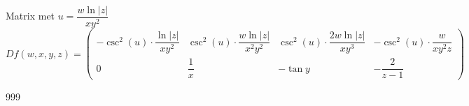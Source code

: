 \documentclass[a4paper]{article}
\begin{document}
Matrix met $u = \dfrac{w\ln|z|}{xy^2}$\\

$Df(w,x,y,z)= \left(\begin{array}{cccc}
-\csc^2\left(u\right)\cdot\dfrac{\ln|z|}{xy^2} & \csc^2\left(u\right)\cdot\dfrac{w\ln|z|}{x^2y^2} &
\csc^2\left(u\right)\cdot\dfrac{2w\ln|z|}{xy^3} & -\csc^2\left(u\right)\cdot\dfrac{w}{xy^2z} \\
0 & \dfrac{1}{x} & -\tan y & -\dfrac{2}{z-1}
\end{array} \right)$\\

\begin{thebibliography}{999}
\end{thebibliography}
\end{document}
